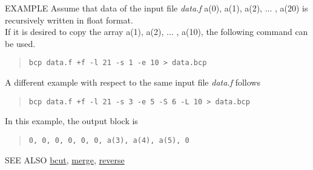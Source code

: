 \begin{qsection}{EXAMPLE}
Assume that data of the input file {\em data.f}
{a(0), a(1), a(2), ... , a(20)} is recursively written in float format.\\
If it is desired to copy the array {a(1), a(2), ... , a(10)}, 
the following command can be used.
\begin{quote}
\verb!bcp data.f +f -l 21 -s 1 -e 10 > data.bcp!
\end{quote}

\par
A different example with respect to the same input file {\em data.f}
follows

\begin{quote}
\verb!bcp data.f +f -l 21 -s 3 -e 5 -S 6 -L 10 > data.bcp!
\end{quote}

In this example, the output block is
\begin{quote}
\verb!0, 0, 0, 0, 0, 0, a(3), a(4), a(5), 0!
\end{quote}
\end{qsection}

\begin{qsection}{SEE ALSO}
\hyperlink{bcut}{bcut},
\hyperlink{merge}{merge},
\hyperlink{reverse}{reverse}
\end{qsection}
